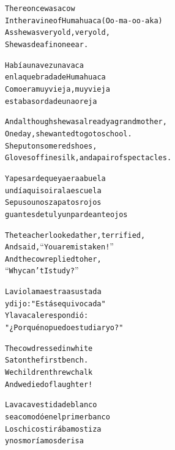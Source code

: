 \documentclass[11pt]{article}
\begin{document}
\begin{parcolumns}{2}

\colchunk
{
\begin{alltt}\normalfont
There once was a cow
In the ravine of Humahuaca (Oo-ma-oo-aka)
As she was very old, very old,
She was deaf in one ear.
\end{alltt}
}

\colchunk
{
\begin{alltt}\normalfont
Había una vez una vaca
en la quebrada de Humahuaca
Como era muy vieja, muy vieja
estaba sorda de una oreja
\end{alltt}
}

\colplacechunks

\colchunk
{
\begin{alltt}\normalfont
And although she was already a grandmother,
One day, she wanted to go to school.
She put on some red shoes,
Gloves of fine silk, and a pair of spectacles.
\end{alltt}
}

\colchunk
{
\begin{alltt}\normalfont
Y a pesar de que ya era abuela
un día quiso ir a la escuela
Se puso unos zapatos rojos
guantes de tul y un par de anteojos
\end{alltt}
}

\colplacechunks

\colchunk
{
\begin{alltt}\normalfont
The teacher looked at her, terrified,
And said, “You are mistaken!”
And the cow replied to her,
“Why can’t I study?”
\end{alltt}
}

\colchunk
{
\begin{alltt}\normalfont
La vio la maestra asustada
y dijo: "Estás equivocada"
Y la vaca le respondió:
"¿Por qué no puedo estudiar yo?"
\end{alltt}
}

\colplacechunks

\colchunk
{
\begin{alltt}\normalfont
The cow dressed in white
Sat on the first bench.
We children threw chalk
And we died of laughter!
\end{alltt}
}

\colchunk
{
\begin{alltt}\normalfont
La vaca vestida de blanco
se acomodó en el primer banco
Los chicos tirábamos tiza
y nos moríamos de risa
\end{alltt}
}

\colplacechunks


\end{parcolumns}
\end{document}
